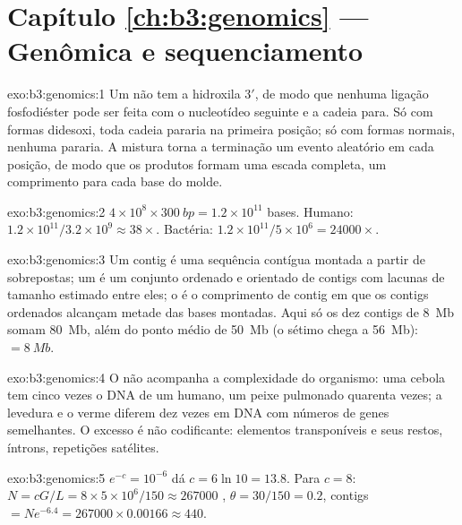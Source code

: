 \section*{Capítulo \ref{ch:b3:genomics} --- Genômica e sequenciamento}

\begin{solution}{exo:b3:genomics:1}
Um  não tem a hidroxila 3$'$, de modo que nenhuma
ligação fosfodiéster pode ser feita com o nucleotídeo seguinte e a
cadeia para. Só com formas didesoxi, toda cadeia pararia na primeira
posição; só com formas normais, nenhuma pararia. A mistura torna a
terminação um evento aleatório em cada posição, de modo que os
produtos formam uma escada completa, um comprimento para cada base do
molde.
\end{solution}

\begin{solution}{exo:b3:genomics:2}
$4\times 10^{8}\times \qty{300}{bp} = 1.2\times 10^{11}$ bases. Humano:
$1.2\times 10^{11}/3.2\times 10^{9} \approx 38\times$. Bactéria:
$1.2\times 10^{11}/5\times 10^{6} = \num{24000}\times$.
\end{solution}

\begin{solution}{exo:b3:genomics:3}
Um contig é uma sequência contígua montada a partir de 
sobrepostas; um  é um conjunto ordenado e orientado de contigs
com lacunas de tamanho estimado entre eles; o  é o comprimento de
contig em que os contigs ordenados alcançam metade das bases montadas.
Aqui só os dez contigs de \qty{8}{Mb} somam \qty{80}{Mb}, além do
ponto médio de \qty{50}{Mb} (o sétimo chega a \qty{56}{Mb}):
 $= \qty{8}{Mb}$.
\end{solution}

\begin{solution}{exo:b3:genomics:4}
O  não acompanha a complexidade do organismo: uma
cebola tem cinco vezes o DNA de um humano, um peixe pulmonado quarenta
vezes; a levedura e o verme diferem dez vezes em DNA com números de
genes semelhantes. O excesso é não codificante: elementos transponíveis
e seus restos, íntrons, repetições satélites.
\end{solution}

\begin{solution}{exo:b3:genomics:5}
$e^{-c} = 10^{-6}$ dá $c = 6\ln 10 = 13.8$. Para $c = 8$: $N =
cG/L = 8\times 5\times 10^{6}/150 \approx \num{267000}$ ,
$\theta
= 30/150 = 0.2$, contigs $= N e^{-6.4} = \num{267000}\times 0.00166
\approx 440$.
\end{solution}


